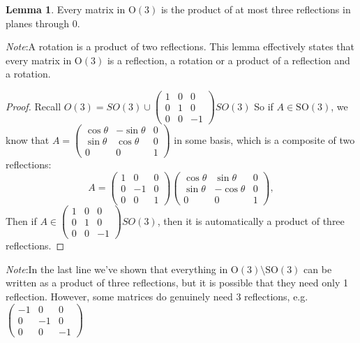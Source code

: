 \documentclass[a4paper]{article}
\theoremstyle{definition}
\newtheorem*{lemma}{Lemma}
\newcommand{\note}{\noindent \emph{Note}:\;}
\newcommand{\Or}{\mathrm{O}}
\newcommand{\SO}{\mathrm{SO}}
\begin{document}
\begin{lemma}
  Every matrix in $\Or(3)$ is the product of at most three reflections in planes through 0.
\end{lemma}
\note A rotation is a product of two reflections. This lemma effectively states that every matrix in $\Or(3)$ is a reflection, a rotation or a product of a reflection and a rotation.

\begin{proof}
  Recall $O(3) = SO(3) \cup 
  \begin{pmatrix}
    1 & 0 & 0\\
    0 & 1 & 0\\
    0 & 0 & -1
  \end{pmatrix}SO(3)$
  So if $A\in \SO(3)$, we know that $A = 
  \begin{pmatrix}
    \cos\theta & -\sin\theta & 0\\
    \sin\theta & \cos\theta & 0\\
    0 & 0 & 1
  \end{pmatrix}$ in some basis, which is a composite of two reflections:
  \[
  A = 
  \begin{pmatrix}
    1 & 0 & 0\\
    0 & -1 & 0\\
    0 & 0 & 1
  \end{pmatrix}
  \begin{pmatrix}
    \cos\theta & \sin\theta & 0\\
    \sin\theta & -\cos\theta & 0\\
    0 & 0 & 1
  \end{pmatrix},
  \]
  Then if $A\in \begin{pmatrix}
    1 & 0 & 0\\
    0 & 1 & 0\\
    0 & 0 & -1
  \end{pmatrix}SO(3)$, then it is automatically a product of three reflections.
\end{proof}
\note In the last line we've shown that everything in $\Or(3)\setminus \SO(3)$ can be written as a product of three reflections, but it is possible that they need only 1 reflection. However, some matrices do genuinely need 3 reflections, e.g.
$\begin{pmatrix}
  -1 & 0 & 0\\
  0 & -1 & 0\\
  0 & 0 & -1
\end{pmatrix}$
\end{document}
